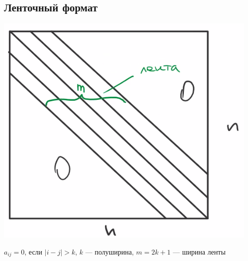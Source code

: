 \documentclass[english]{article}
\theoremstyle{plain}
\theoremstyle{remark}
\theoremstyle{definition}
\begin{document}
\subsection{Ленточный формат}
\label{sec:orgf688710}
\begin{center}
\includegraphics[scale=0.3]{10_2.png}
\end{center}
\(a_{ij} = 0\), если \(|i - j| > k\), \(k\) --- полуширина, \(m = 2k + 1\) --- ширина ленты
\end{document}

